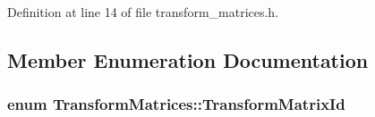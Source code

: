 Definition at line 14 of file transform\+\_\+matrices.\+h.



\subsection{Member Enumeration Documentation}
\hypertarget{class_transform_matrices_ac0c0f9ab5279bfd44b4c1fd97f041521}{}
\subsubsection[{Transform\+Matrix\+Id}]{\setlength{\rightskip}{0pt plus 5cm}enum {\bf Transform\+Matrices\+::\+Transform\+Matrix\+Id}}\label{class_transform_matrices_ac0c0f9ab5279bfd44b4c1fd97f041521}
